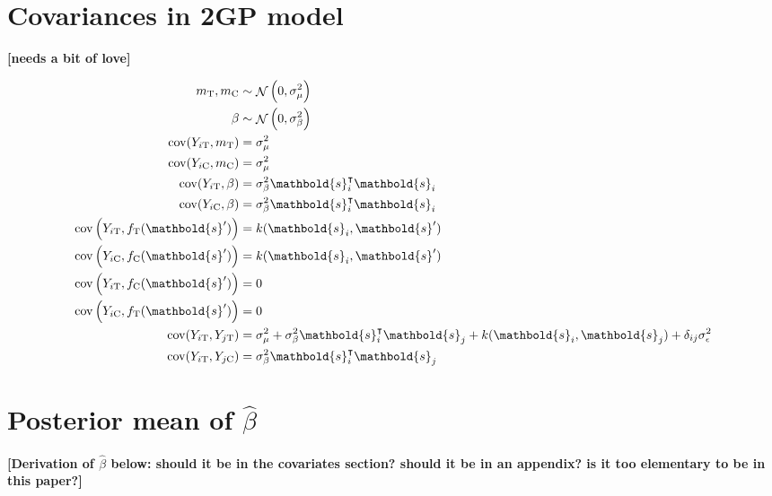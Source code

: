 \documentclass[letter]{article}
\DeclareMathOperator{\cov}{{cov}}
\DeclareMathOperator{\normal}{\mathcal{N}}
\newcommand{\trans}{^{\intercal}}
\newcommand{\treat}{\mathrm{T}}
\newcommand{\ctrol}{\mathrm{C}}
\newcommand{\sigman}{\sigma_{\epsilon}}
\newcommand{\sigmabeta}{\sigma_{\beta}}
\newcommand{\sigmamu}{\sigma_{\mu}}
\newcommand{\svec}{\mathbold{s}}
\newcommand{\eqlabel}[1]{\label{#1}}
\begin{document}
    	\appendix
    


    	\section{Covariances in 2GP model}\label{covariances-in-2gp-model}

\textbf{{[}needs a bit of love{]}}
    


    	\begin{equation}
\begin{split}
    m_\treat, m_\ctrol   &\sim \normal\del{0,\sigmamu^2} \\
    \beta &\sim \normal\del{0,\sigmabeta^2} \\
    \cov(Y_{i\treat},m_\treat)  &= \sigmamu^2 \\
    \cov(Y_{i\ctrol},m_\ctrol)  &= \sigmamu^2 \\
    \cov(Y_{i\treat},\beta)&= \sigmabeta^2 \svec_i \trans \svec_i \\
    \cov(Y_{i\ctrol},\beta)&= \sigmabeta^2 \svec_i \trans \svec_i \\
    \cov\del{Y_{i\treat}, f_{\treat}(\svec')} &= k(\svec_i,\svec') \\
    \cov\del{Y_{i\ctrol}, f_{\ctrol}(\svec')} &= k(\svec_i,\svec') \\
    \cov\del{Y_{i\treat}, f_{\ctrol}(\svec')} &= 0 \\
    \cov\del{Y_{i\ctrol}, f_{\treat}(\svec')} &= 0 \\
    \cov(Y_{i\treat},Y_{j\treat}) &= \sigmamu^2 + \sigmabeta^2 \svec_i\trans \svec_j + k(\svec_i,\svec_j) + \delta_{ij}\sigman^2 \\
    \cov(Y_{i\treat},Y_{j\ctrol}) &= \sigmabeta^2 \svec_i\trans \svec_j
\end{split}
\eqlabel{eq:covariances}
\end{equation}
    


    	\section{\texorpdfstring{Posterior mean of \(\hat\beta\)}{Posterior mean of \textbackslash{}hat\textbackslash{}beta}}\label{posterior-mean-of-hatbeta}

\textbf{{[}Derivation of \(\hat{\beta}\) below: should it be in the covariates section? should it be in an appendix? is it too elementary to be in this paper?{]}}
\end{document}
